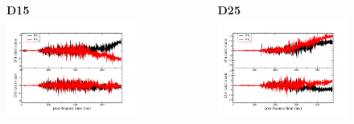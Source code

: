 \documentclass[aspectratio=169]{beamer}
\begin{document}
\begin{frame}

  \begin{columns}[c]

      \begin{figure}
        \textbf{D15}
        \includegraphics[width=1.0\textwidth]{Figures/D15_strain.pdf}
      \end{figure}

      \begin{figure}
        \textbf{D25}
        \includegraphics[width=1.0\textwidth]{Figures/D25_strain.pdf}
      \end{figure}

  \end{columns}

\end{frame}
\end{document}
